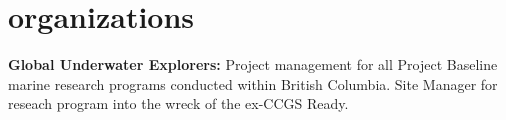 \documentclass[]{friggeri-cv} %
\begin{document}

\section{organizations}

\textbf{Global Underwater Explorers:} Project management for all Project Baseline marine research programs conducted within British Columbia. Site Manager for reseach program into the wreck of the ex-CCGS Ready.










\end{document}
